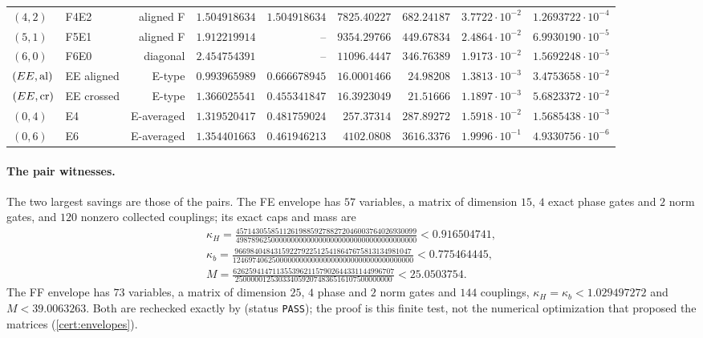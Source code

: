 {\begin{longtable}{@{}llrrrrrrr@{}}
$(4,2)$ & F4E2 & aligned F & $1.504918634$ & $1.504918634$ & $7825.40227$ & $682.24187$ & $3.7722\cdot10^{-2}$ & $1.2693722\cdot10^{-4}$\\
$(5,1)$ & F5E1 & aligned F & $1.912219914$ & -- & $9354.29766$ & $449.67834$ & $2.4864\cdot10^{-2}$ & $6.9930190\cdot10^{-5}$\\
$(6,0)$ & F6E0 & diagonal & $2.454754391$ & -- & $11096.4447$ & $346.76389$ & $1.9173\cdot10^{-2}$ & $1.5692248\cdot10^{-5}$\\
$(EE,{\rm al})$ & EE aligned & E-type & $0.993965989$ & $0.666678945$ & $16.0001466$ & $24.98208$ & $1.3813\cdot10^{-3}$ & $3.4753658\cdot10^{-2}$\\
$(EE,{\rm cr})$ & EE crossed & E-type & $1.366025541$ & $0.455341847$ & $16.3923049$ & $21.51666$ & $1.1897\cdot10^{-3}$ & $5.6823372\cdot10^{-2}$\\
$(0,4)$ & E4 & E-averaged & $1.319520417$ & $0.481759024$ & $257.37314$ & $287.89272$ & $1.5918\cdot10^{-2}$ & $1.5685438\cdot10^{-3}$\\
$(0,6)$ & E6 & E-averaged & $1.354401663$ & $0.461946213$ & $4102.0808$ & $3616.3376$ & $1.9996\cdot10^{-1}$ & $4.9330756\cdot10^{-6}$\\
\end{longtable}
}

\paragraph{The pair witnesses.}
The two largest savings are those of the pairs. The FE envelope has $57$
variables, a matrix of dimension $15$, $4$ exact phase
gates and $2$ norm gates, and $120$ nonzero collected
couplings; its exact caps and mass are
\begin{gather*}
 \kappa_H=\frac{4571430558511261988592788272046003764026930099}{4987896250000000000000000000000000000000000000}<0.916504741,\\
 \kappa_b=\frac{966984048431592279225125418647675813134981047}{1246974062500000000000000000000000000000000000}<0.775464445,\\
 M=\frac{62625941471135539621157902644331144996707}{2500000125303340592074836516107500000000}<25.0503754.
\end{gather*}
The FF envelope has $73$ variables, a matrix of dimension
$25$, $4$ phase and $2$ norm gates and
$144$ couplings, $\kappa_H=\kappa_b<1.029497272$ and $M<39.0063263$.
Both are rechecked exactly by
(status \texttt{PASS}); the proof is this finite test, not the numerical
optimization that proposed the matrices (\cref{cert:envelopes}).

